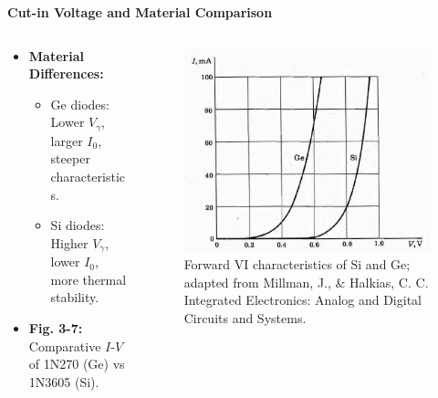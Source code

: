 \begin{frame}{\textbf{Cut-in Voltage and Material Comparison}}
	\begin{columns}
		\begin{column}{0.35\textwidth}
    \begin{itemize}
        \item \textbf{Material Differences:}
        \begin{itemize}
            \item Ge diodes: Lower $V_\gamma$, larger $I_0$, steeper characteristics.
            \item Si diodes: Higher $V_\gamma$, lower $I_0$, more thermal stability.
        \end{itemize}
        \item \textbf{Fig. 3-7:} Comparative $I$-$V$ of 1N270 (Ge) vs 1N3605 (Si).
    \end{itemize}
\end{column}
\begin{column}{0.65\textwidth}
	\begin{figure}
		\centering
		\includegraphics[scale=0.25]{fig/lec03/VI_character_Si_Ge.png}
		\caption{Forward VI characteristics of Si and Ge; adapted from Millman, J., \& Halkias, C. C. Integrated Electronics: Analog and Digital Circuits and Systems.}
		\label{fig:Si_Ge_diode_characteristics}
	\end{figure}
	\end{column}
	\end{columns}
\end{frame}

